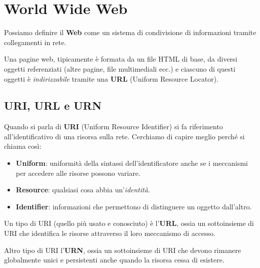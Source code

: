 \section{World Wide Web}
Possiamo definire il \textbf{Web} come un sistema di condivisione di informazioni tramite
collegamenti in rete.

Una pagine web, tipicamente è formata da un file HTML di base, da diversi oggetti referenziati
(altre pagine, file multimediali ecc.) e ciascuno di questi oggetti è \emph{indirizzabile} tramite
una \textbf{URL} (Uniform Resource Locator).

\subsection{URI, URL e URN}
Quando si parla di \textbf{URI} (Uniform Resource Identifier) si fa riferimento all'identificativo
di una risorsa sulla rete. Cerchiamo di capire meglio perché si chiama così:
\begin{itemize}
	\item \textbf{Uniform}: uniformità della sintassi dell'identificatore anche se i meccanismi
		per accedere alle risorse possono variare.
	\item \textbf{Resource}: qualsiasi cosa abbia un'\emph{identità}.
	\item \textbf{Identifier}: informazioni che permettono di distinguere un oggetto dall'altro.
\end{itemize}
Un tipo di URI (quello più usato e conosciuto) è l'\textbf{URL}, ossia un sottoinsieme di URI che 
identifica le risorse attraverso il loro meccanismo di accesso.

Altro tipo di URI l'\textbf{URN}, ossia un sottoinsieme di URI che devono rimanere globalmente
unici e persistenti anche quando la risorsa cessa di esistere.

